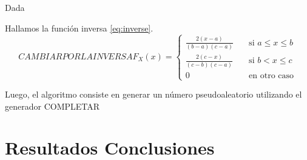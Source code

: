 \documentclass{sig-alternate}
\begin{document}
Dada 

Hallamos la funci\'on inversa \eqref{eq:inverse}.\\

\begin{equation}
\label{eq:inverse}
CAMBIAR POR LA INVERSA
F_{X}(x) =
\begin{cases}
\frac{2(x-a)}{(b-a)(c-a)} \quad & \text{si } a\leq x \leq b \\
\frac{2(c-x)}{(c-b)(c-a)} \quad & \text{si } b < x \leq c \\
0 \quad & \text{en otro caso}
\end{cases}
\end{equation}


Luego, el algoritmo consiste en generar un n\'umero pseudoaleatorio utilizando
el generador COMPLETAR


\newpage

\section{Resultados Conclusiones}
\label{sec:conclusiones}

\end{document}
